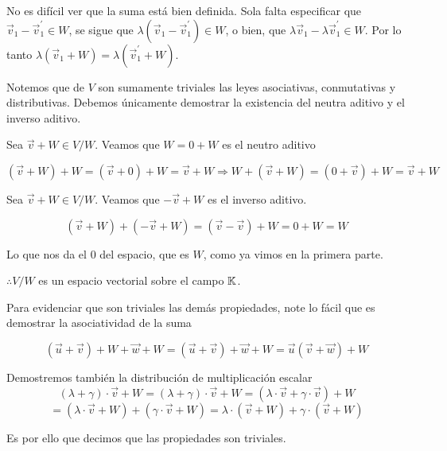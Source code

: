 \begin{proofexplanation}
    No es difícil ver que la suma está bien definida. Sola falta especificar que \(\vec{v}_1-\vec{v}_1^\prime \in W\), se sigue que \(\lambda(\vec{v}_1-\vec{v}_1^\prime)\in W\), o bien, que \(\lambda\vec{v}_1-\lambda\vec{v}_1^\prime \in W\). Por lo tanto \(\lambda(\vec{v}_1+W)=\lambda(\vec{v}_1^\prime+W)\). 

    Notemos que de $V$ son sumamente triviales las leyes asociativas, conmutativas y distributivas. Debemos únicamente demostrar la existencia del neutra aditivo y el inverso aditivo.

    Sea $\vec{v} + W \in V / W$. Veamos que $W = 0 +W$ es el neutro aditivo

    \begin{equation*}
        (\vec{v} + W) + W = (\vec{v} + 0) + W = \vec{v} + W \Rightarrow W + (\vec{v} + W) = (0 + \vec{v}) + W = \vec{v} + W
    \end{equation*}

    Sea $\vec{v} + W \in V / W$. Veamos que $-\vec{v} + W$ es el inverso aditivo. 
        
    \begin{equation*}
        (\vec{v} + W) + (-\vec{v} + W) = (\vec{v} - \vec{v}) + W = 0 + W = W
    \end{equation*}

    Lo que nos da el 0 del espacio, que es $W$, como ya vimos en la primera parte. 

    $\therefore V / W$ es un espacio vectorial sobre el campo $\mathbb{K}$. 

    Para evidenciar que son triviales las demás propiedades, note lo fácil que es demostrar la asociatividad de la suma

    \begin{equation*}
        (\vec{u} + \vec{v}) + W + \vec{w} + W = (\vec{u} + \vec{v}) + \vec{w} + W = \vec{u} (\vec{v} + \vec{w}) + W
    \end{equation*}

    Demostremos también la distribución de multiplicación escalar
    $$
        (\lambda  + \gamma ) \cdot \vec{v} + W = (\lambda  + \gamma )\cdot \vec{v} + W = (\lambda \cdot \vec{v} + \gamma \cdot \vec{v}) + W  
    $$
    $$=(\lambda \cdot \vec{v} + W) + (\gamma \cdot \vec{v} + W) = \lambda \cdot (\vec{v} + W) + \gamma \cdot (\vec{v} + W)$$

    Es por ello que decimos que las propiedades son triviales.
\end{proofexplanation}

